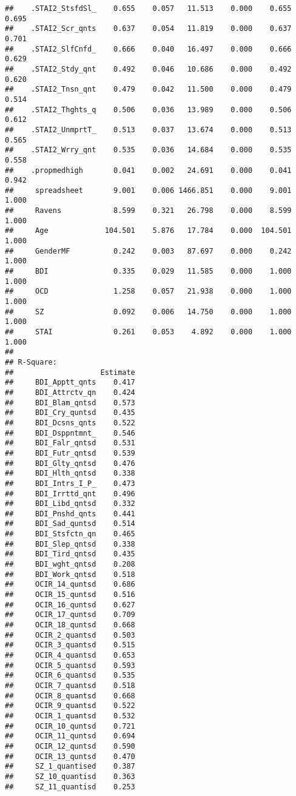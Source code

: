 \documentclass[]{article}
\begin{document}
\begin{verbatim}
##    .STAI2_StsfdSl_    0.655    0.057   11.513    0.000    0.655    0.695
##    .STAI2_Scr_qnts    0.637    0.054   11.819    0.000    0.637    0.701
##    .STAI2_SlfCnfd_    0.666    0.040   16.497    0.000    0.666    0.629
##    .STAI2_Stdy_qnt    0.492    0.046   10.686    0.000    0.492    0.620
##    .STAI2_Tnsn_qnt    0.479    0.042   11.500    0.000    0.479    0.514
##    .STAI2_Thghts_q    0.506    0.036   13.989    0.000    0.506    0.612
##    .STAI2_UnmprtT_    0.513    0.037   13.674    0.000    0.513    0.565
##    .STAI2_Wrry_qnt    0.535    0.036   14.684    0.000    0.535    0.558
##    .propmedhigh       0.041    0.002   24.691    0.000    0.041    0.942
##     spreadsheet       9.001    0.006 1466.851    0.000    9.001    1.000
##     Ravens            8.599    0.321   26.798    0.000    8.599    1.000
##     Age             104.501    5.876   17.784    0.000  104.501    1.000
##     GenderMF          0.242    0.003   87.697    0.000    0.242    1.000
##     BDI               0.335    0.029   11.585    0.000    1.000    1.000
##     OCD               1.258    0.057   21.938    0.000    1.000    1.000
##     SZ                0.092    0.006   14.750    0.000    1.000    1.000
##     STAI              0.261    0.053    4.892    0.000    1.000    1.000
## 
## R-Square:
##                    Estimate
##     BDI_Apptt_qnts    0.417
##     BDI_Attrctv_qn    0.424
##     BDI_Blam_qntsd    0.573
##     BDI_Cry_quntsd    0.435
##     BDI_Dcsns_qnts    0.522
##     BDI_Dsppntmnt_    0.546
##     BDI_Falr_qntsd    0.531
##     BDI_Futr_qntsd    0.539
##     BDI_Glty_qntsd    0.476
##     BDI_Hlth_qntsd    0.338
##     BDI_Intrs_I_P_    0.473
##     BDI_Irrttd_qnt    0.496
##     BDI_Libd_qntsd    0.332
##     BDI_Pnshd_qnts    0.441
##     BDI_Sad_quntsd    0.514
##     BDI_Stsfctn_qn    0.465
##     BDI_Slep_qntsd    0.338
##     BDI_Tird_qntsd    0.435
##     BDI_wght_qntsd    0.208
##     BDI_Work_qntsd    0.518
##     OCIR_14_quntsd    0.686
##     OCIR_15_quntsd    0.516
##     OCIR_16_quntsd    0.627
##     OCIR_17_quntsd    0.709
##     OCIR_18_quntsd    0.668
##     OCIR_2_quantsd    0.503
##     OCIR_3_quantsd    0.515
##     OCIR_4_quantsd    0.653
##     OCIR_5_quantsd    0.593
##     OCIR_6_quantsd    0.535
##     OCIR_7_quantsd    0.518
##     OCIR_8_quantsd    0.668
##     OCIR_9_quantsd    0.522
##     OCIR_1_quantsd    0.532
##     OCIR_10_quntsd    0.721
##     OCIR_11_quntsd    0.694
##     OCIR_12_quntsd    0.590
##     OCIR_13_quntsd    0.470
##     SZ_1_quantised    0.387
##     SZ_10_quantisd    0.363
##     SZ_11_quantisd    0.253

\end{verbatim}
\end{document}
